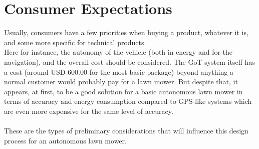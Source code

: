 \section{Consumer Expectations}
Usually, consumers have a few priorities when buying a product, whatever it is, and some more specific for technical products.\\
Here for instance, the autonomy of the vehicle (both in energy and for the navigation), and the overall cost should be considered. The GoT system itself has a cost (around USD 600.00 for the most basic package) beyond anything a normal customer would probably pay for a lawn mower. But despite that, it appears, at first, to be a good solution for a basic autonomous lawn mower in terms of accuracy and energy consumption compared to GPS-like systems which are even more expensive for the same level of accuracy. \\\\
These are the types of preliminary considerations that will influence this design process for an autonomous lawn mower.

